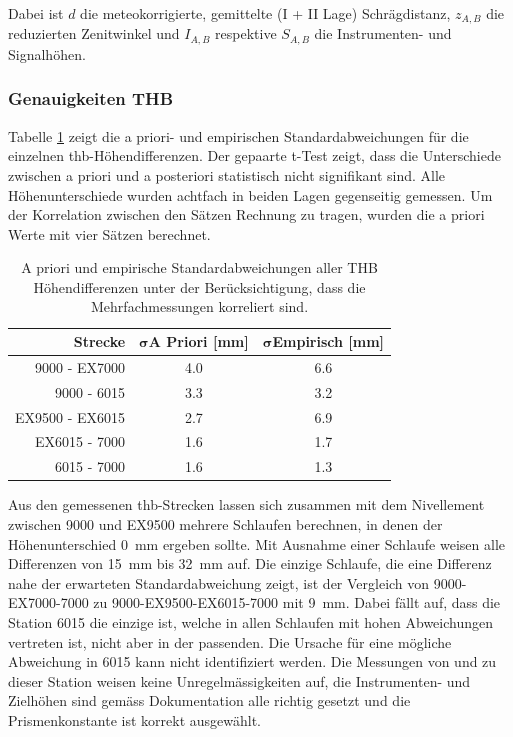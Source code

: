 Dabei ist $d$ die meteokorrigierte, gemittelte (I + II Lage) Schrägdistanz, $z_{A,B}$ die reduzierten Zenitwinkel und $I_{A,B}$ respektive 
$S_{A,B}$ die Instrumenten- und Signalhöhen.


\subsubsection{Genauigkeiten THB}
Tabelle \ref{tab:THB_Stdabw} zeigt die a priori- und empirischen Standardabweichungen für die einzelnen \acrshort{thb}-Höhendifferenzen. Der gepaarte t-Test zeigt, dass die 
Unterschiede zwischen a priori und a posteriori statistisch nicht signifikant sind. Alle Höhenunterschiede wurden achtfach in beiden 
Lagen gegenseitig gemessen. Um der Korrelation zwischen den Sätzen Rechnung zu tragen, wurden die a priori Werte mit vier Sätzen berechnet.  

\begin{table}[h]
    \centering
    \caption{A priori und empirische Standardabweichungen aller THB Höhendifferenzen unter der Berücksichtigung, dass die Mehrfachmessungen 
    korreliert sind.}
    \label{tab:THB_Stdabw}
    \begin{tabular}{rcc}
        \toprule
        \textbf{Strecke} & $\mathbf{\sigma}$\textbf{A Priori [mm]} & $\mathbf{\sigma}$\textbf{Empirisch [mm]} \\
        \midrule
        9000 - EX7000 & 4.0 & 6.6  \\
        \rowcolor{lightgray}
        9000 - 6015 & 3.3 & 3.2 \\
        EX9500 - EX6015 & 2.7 & 6.9 \\
        \rowcolor{lightgray}
        EX6015 - 7000 & 1.6 & 1.7  \\
        6015 - 7000 & 1.6 & 1.3 \\
        \bottomrule
    \end{tabular}
\end{table}

Aus den gemessenen \acrshort{thb}-Strecken lassen sich zusammen mit dem Nivellement zwischen 9000 und EX9500 mehrere Schlaufen 
berechnen, in denen der Höhenunterschied 0~mm ergeben sollte. Mit Ausnahme einer Schlaufe weisen alle Differenzen von 
15~mm bis 32~mm auf. Die einzige Schlaufe, die eine Differenz nahe der erwarteten Standardabweichung zeigt, ist der Vergleich 
von 9000-EX7000-7000 zu 9000-EX9500-EX6015-7000 mit 9~mm. Dabei fällt auf, dass die Station 6015 die einzige ist, welche 
in allen Schlaufen mit hohen Abweichungen vertreten ist, nicht aber in der passenden. Die Ursache für eine mögliche 
Abweichung in 6015 kann nicht identifiziert werden. Die Messungen von und zu dieser Station weisen keine Unregelmässigkeiten auf, 
die Instrumenten- und Zielhöhen sind gemäss Dokumentation alle richtig gesetzt und die Prismenkonstante ist korrekt ausgewählt. 

